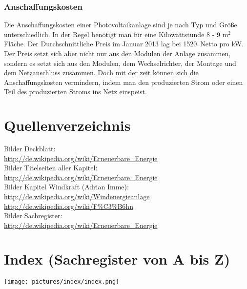 \documentclass[12pt]{scrbook}
\begin{document}
\subsection{Anschaffungskosten}

Die Anschaffungskosten einer Photovoltaikanlage sind je nach Typ und Größe
unterschiedlich. In der Regel benötigt man für eine Kilowattstunde 8 - 9 m$^2$
Fläche. Der Durchschnittliche Preis im Januar 2013 lag bei 1520\texteuro~Netto pro kW.
Der Preis setzt sich aber nicht nur aus den Modulen der Anlage zusammen,
sondern es setzt sich aus den Modulen, dem Wechselrichter, der Montage und dem
Netzanschluss zusammen. Doch mit der zeit können sich die Anschaffungskosten
vermindern, indem man den produzierten Strom oder einen Teil des produzierten
Stroms ins Netz einspeist.


\newpage

\chapter{Quellenverzeichnis}

Bilder Deckblatt: \\
\url{http://de.wikipedia.org/wiki/Erneuerbare_Energie}\\

Bilder Titelseiten aller Kapitel: \\
\url{http://de.wikipedia.org/wiki/Erneuerbare_Energie}\\

Bilder Kapitel Windkraft (Adrian Imme):\\
\url{http://de.wikipedia.org/wiki/Windenergieanlage}\\
\url{http://de.wikipedia.org/wiki/F\%C3\%B6hn}\\

Bilder Sachregister: \\
\url{http://de.wikipedia.org/wiki/Erneuerbare_Energie}\\


\newpage

\chapter{Index (Sachregister von A bis Z)}

\begin{center}
\texttt{[image: pictures/index/index.png]}
\end{center}



\newpage




\renewcommand{\indexname}{Sachregister}

\printindex
\end{document}
